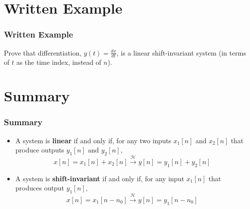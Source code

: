 \documentclass{beamer}
\begin{document}
\section[Example]{Written Example}
\setcounter{subsection}{1}

\begin{frame}
  \frametitle{Written Example}

  Prove that differentiation, $y(t)=\frac{dx}{dt}$, is a linear
  shift-invariant system (in terms of $t$ as the time index, instead
  of $n$).
\end{frame}

\section[Summary]{Summary}
\setcounter{subsection}{1}

\begin{frame}
  \frametitle{Summary}
  \begin{itemize}
  \item A system is {\bf linear} if and only if, for any two inputs
    $x_1[n]$ and $x_2[n]$ that produce outputs $y_1[n]$ and $y_2[n]$,
    \[
    x[n]=x_1[n]+x_2[n] \stackrel{\mathcal H}{\longrightarrow}  y[n]=y_1[n]+y_2[n]
    \]
  \item A system is {\bf shift-invariant} if and only if, for any input
    $x_1[n]$ that produces output $y_1[n]$,
    \[
    x[n]=x_1[n-n_0] \stackrel{\mathcal H}{\longrightarrow}  y[n]=y_1[n-n_0]
    \]
  \end{itemize}
\end{frame}
    
\end{document}
